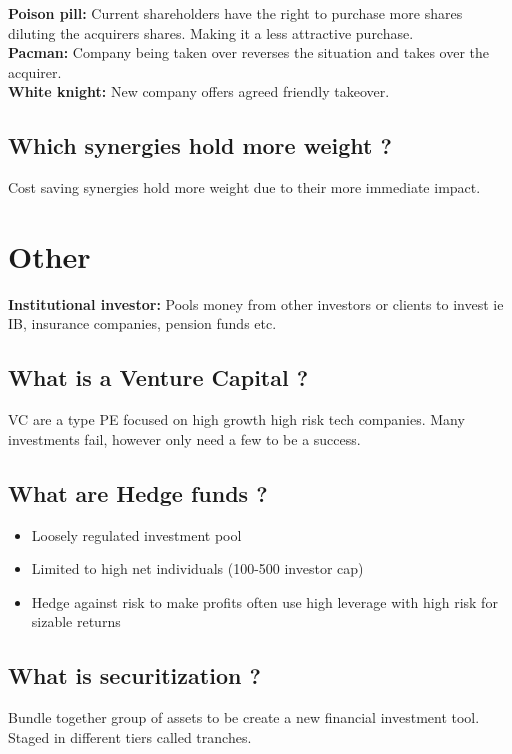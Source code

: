 \documentclass[11pt]{scrartcl} %
\begin{document}
\textbf{Poison pill:} Current shareholders have the right to purchase more shares diluting the acquirers shares. Making it a less attractive purchase.\\
\textbf{Pacman:} Company being taken over reverses the situation and takes over the acquirer.\\
\textbf{White knight:} New company offers agreed friendly takeover.

\subsection{Which synergies hold more weight ?}

Cost saving synergies hold more weight due to their more immediate impact.

\section{Other}

\textbf{Institutional investor:} Pools money from other investors or clients to invest ie IB, insurance companies, pension funds etc.

\subsection{What is a Venture Capital ?}

VC are a type PE focused on high growth high risk tech companies. Many investments fail, however only need a few to be a success.

\subsection{What are Hedge funds ?}

\begin{itemize}
	\item Loosely regulated investment pool
	\item Limited to high net individuals (100-500 investor cap)
	\item Hedge against risk to make profits often use high leverage with high risk for sizable returns
\end{itemize}

\subsection{What is securitization ?}

Bundle together group of assets to be create a new financial investment tool. Staged in different tiers called tranches.
\end{document}
